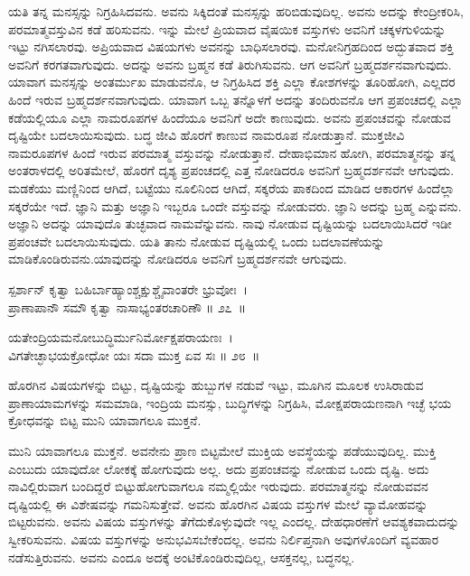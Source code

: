 ಯತಿ ತನ್ನ ಮನಸ್ಸನ್ನು ನಿಗ್ರಹಿಸಿದವನು. ಅವನು ಸಿಕ್ಕಿದಂತೆ ಮನಸ್ಸನ್ನು ಹರಿಬಿಡುವುದಿಲ್ಲ. ಅವನು ಅದನ್ನು ಕೇಂದ್ರೀಕರಿಸಿ, ಪರಮಾತ್ಮವಸ್ತುವಿನ ಕಡೆ ಹರಿಸುವನು. ಇನ್ನು ಮೇಲೆ ಪ್ರಿಯವಾದ ವೈಷಯಿಕ ವಸ್ತುಗಳು ಅವನಿಗೆ ಚಕ್ಕಳಗುಳಿಯನ್ನು ಇಟ್ಟು ನಗಿಸಲಾರವು. ಅಪ್ರಿಯವಾದ ವಿಷಯಗಳು ಅವನನ್ನು ಬಾಧಿಸಲಾರವು. ಮನೋನಿಗ್ರಹದಿಂದ ಅದ್ಭುತವಾದ ಶಕ್ತಿ ಅವನಿಗೆ ಕರಗತವಾಗುವುದು. ಅದನ್ನು ಅವನು ಬ್ರಹ್ಮನ ಕಡೆ ತಿರುಗಿಸುವನು. ಆಗ ಅವನಿಗೆ ಬ್ರಹ್ಮದರ್ಶನವಾಗುವುದು. ಯಾವಾಗ ಮನಸ್ಸನ್ನು ಅಂತರ್ಮುಖ ಮಾಡುವನೊ, ಆ ನಿಗ್ರಹಿಸಿದ ಶಕ್ತಿ ಎಲ್ಲಾ ಕೋಶಗಳನ್ನು ತೂರಿಹೋಗಿ, ಎಲ್ಲದರ ಹಿಂದೆ ಇರುವ ಬ್ರಹ್ಮದರ್ಶನವಾಗುವುದು. ಯಾವಾಗ ಒಬ್ಬ ತನ್ನೊಳಗೆ ಅದನ್ನು ತಂದಿರುವನೊ ಆಗ ಪ್ರಪಂಚದಲ್ಲಿ ಎಲ್ಲಾ ಕಡೆಯಲ್ಲಿಯೂ ಎಲ್ಲಾ ನಾಮರೂಪಗಳ ಹಿಂದೆಯೂ ಅವನಿಗೆ ಅದೇ ಕಾಣುವುದು. ಅವನು ಪ್ರಪಂಚವನ್ನು ನೋಡುವ ದೃಷ್ಟಿಯೇ ಬದಲಾಯಿಸುವುದು. ಬದ್ಧ ಜೀವಿ ಹೊರಗೆ ಕಾಣುವ ನಾಮರೂಪ ನೋಡುತ್ತಾನೆ. ಮುಕ್ತಜೀವಿ ನಾಮರೂಪಗಳ ಹಿಂದೆ ಇರುವ ಪರಮಾತ್ಮ ವಸ್ತುವನ್ನು ನೋಡುತ್ತಾನೆ. ದೇಹಾಭಿಮಾನ ಹೋಗಿ, ಪರಮಾತ್ಮನನ್ನು ತನ್ನ ಅಂತರಾಳದಲ್ಲಿ ಅರಿತಮೇಲೆ, ಹೊರಗೆ ದೃಶ್ಯ ಪ್ರಪಂಚದಲ್ಲಿ ಎತ್ತ ನೋಡಿದರೂ ಅವನಿಗೆ ಬ್ರಹ್ಮದರ್ಶನವೇ ಆಗುವುದು. ಮಡಕೆಯು ಮಣ್ಣಿನಿಂದ ಆಗಿದೆ, ಬಟ್ಟೆಯು ನೂಲಿನಿಂದ ಆಗಿದೆ, ಸಕ್ಕರೆಯ ಪಾಕದಿಂದ ಮಾಡಿದ ಆಕಾರಗಳ ಹಿಂದೆಲ್ಲಾ ಸಕ್ಕರೆಯೇ ಇದೆ. ಜ್ಞಾನಿ ಮತ್ತು ಅಜ್ಞಾನಿ ಇಬ್ಬರೂ ಒಂದೇ ವಸ್ತುವನ್ನು ನೋಡುವರು. ಜ್ಞಾನಿ ಅದನ್ನು ಬ್ರಹ್ಮ ಎನ್ನುವನು. ಅಜ್ಞಾನಿ ಅದನ್ನು ಯಾವುದೊ ತುಚ್ಛವಾದ ನಾಮವೆನ್ನುವನು. ನಾವು ನೋಡುವ ದೃಷ್ಟಿಯನ್ನು ಬದಲಾಯಿಸಿದರೆ ಇಡೀ ಪ್ರಪಂಚವೇ ಬದಲಾಯಿಸುವುದು. ಯತಿ ತಾನು ನೋಡುವ ದೃಷ್ಟಿಯಲ್ಲಿ ಒಂದು ಬದಲಾವಣೆಯನ್ನು ಮಾಡಿಕೊಂಡಿರುವನು.\break ಯಾವುದನ್ನು ನೋಡಿದರೂ ಅವನಿಗೆ ಬ್ರಹ್ಮದರ್ಶನವೇ ಆಗುವುದು.

\begin{shloka}
ಸ್ಪರ್ಶಾನ್ ಕೃತ್ವಾ ಬಹಿರ್ಬಾಹ್ಯಾಂಶ್ಚಕ್ಷುಶ್ಚೈವಾಂತರೇ ಭ್ರುವೋಃ~।\\ಪ್ರಾಣಾಪಾನೌ ಸಮೌ ಕೃತ್ವಾ ನಾಸಾಭ್ಯಂತರಚಾರಿಣೌ \hfill॥ ೨೭~॥
\end{shloka}

\begin{shloka}
ಯತೇಂದ್ರಿಯಮನೋಬುದ್ಧಿರ್ಮುನಿರ್ಮೋಕ್ಷಪರಾಯಣಃ~।\\ವಿಗತೇಚ್ಛಾಭಯಕ್ರೋಧೋ ಯಃ ಸದಾ ಮುಕ್ತ ಏವ ಸಃ \hfill॥ ೨೮~॥
\end{shloka}

\begin{artha}
ಹೊರಗಿನ ವಿಷಯಗಳನ್ನು ಬಿಟ್ಟು, ದೃಷ್ಟಿಯನ್ನು ಹುಬ್ಬುಗಳ ನಡುವೆ ಇಟ್ಟು, ಮೂಗಿನ ಮೂಲಕ ಉಸಿರಾಡುವ ಪ್ರಾಣಾಯಾಮಗಳನ್ನು ಸಮಮಾಡಿ, ಇಂದ್ರಿಯ ಮನಸ್ಸು, ಬುದ್ಧಿಗಳನ್ನು ನಿಗ್ರಹಿಸಿ, ಮೋಕ್ಷಪರಾಯಣನಾಗಿ ಇಚ್ಛೆ ಭಯ ಕ್ರೋಧವನ್ನು ಬಿಟ್ಟ ಮುನಿ ಯಾವಾಗಲೂ ಮುಕ್ತನೆ.
\end{artha}

ಮುನಿ ಯಾವಾಗಲೂ ಮುಕ್ತನೆ. ಅವನೇನು ಪ್ರಾಣ ಬಿಟ್ಟಮೇಲೆ ಮುಕ್ತಿಯ ಅವಸ್ಥೆಯನ್ನು ಪಡೆಯುವುದಿಲ್ಲ. ಮುಕ್ತಿ ಎಂಬುದು ಯಾವುದೋ ಲೋಕಕ್ಕೆ ಹೋಗುವುದು ಅಲ್ಲ. ಅದು ಪ್ರಪಂಚವನ್ನು ನೋಡುವ ಒಂದು ದೃಷ್ಟಿ. ಅದು ನಾವಿಲ್ಲಿರುವಾಗ ಬಂದಿದ್ದರೆ ಬಿಟ್ಟುಹೋಗು\-ವಾಗಲೂ ನಮ್ಮಲ್ಲಿಯೇ ಇರುವುದು. ಪರಮಾತ್ಮನನ್ನು ನೋಡುವವನ ದೃಷ್ಟಿಯಲ್ಲಿ ಈ ವಿಶೇಷವನ್ನು ಗಮನಿಸುತ್ತೇವೆ. ಅವನು ಹೊರಗಿನ ವಿಷಯ ವಸ್ತುಗಳ ಮೇಲೆ ವ್ಯಾಮೋಹವನ್ನು ಬಿಟ್ಟರುವನು. ಅವನು ವಿಷಯ ವಸ್ತುಗಳನ್ನು ತೆಗೆದುಕೊಳ್ಳುವುದೇ ಇಲ್ಲ ಎಂದಲ್ಲ. ದೇಹಧಾರಣೆಗೆ ಆವಶ್ಯಕವಾದುದನ್ನು ಸ್ವೀಕರಿಸುವನು. ವಿಷಯ ವಸ್ತುಗಳನ್ನು ಅನುಭವಿಸಬೇಕೆಂದಲ್ಲ. ಅವನು ನಿರ್ಲಿಪ್ತನಾಗಿ ಅವುಗಳೊಂದಿಗೆ ವ್ಯವಹಾರ ನಡೆಸುತ್ತಿರುವನು. ಅವನು ಎಂದೂ ಅದಕ್ಕೆ ಅಂಟಿ\-ಕೊಂಡಿರುವುದಿಲ್ಲ, ಆಸಕ್ತನಲ್ಲ, ಬದ್ಧನಲ್ಲ.

